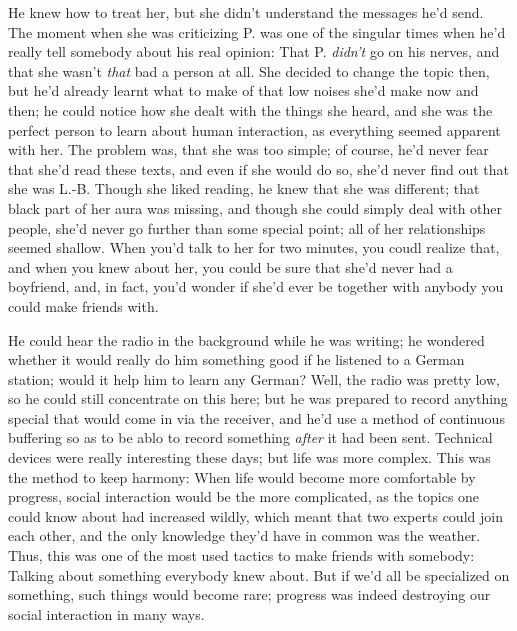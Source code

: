 He knew how to treat her, but she didn't understand the messages he'd send. The moment when she was criticizing P. was one of the singular times when he'd really tell somebody about his real opinion: That P. \emph{didn't} go on his nerves, and that she wasn't \emph{that} bad a person at all. She decided to change the topic then, but he'd already learnt what to make of that low noises she'd make now and then; he could notice how she dealt with the things she heard, and she was the perfect person to learn about human interaction, as everything seemed apparent with her. The problem was, that she was too simple; of course, he'd never fear that she'd read these texts, and even if she would do so, she'd never find out that she was L.-B. Though she liked reading, he knew that she was different; that black part of her aura was missing, and though she could simply deal with other people, she'd never go further than some special point; all of her relationships seemed shallow. When you'd talk to her for two minutes, you coudl realize that, and when you knew about her, you could be sure that she'd never had a boyfriend, and, in fact, you'd wonder if she'd ever be together with anybody you could make friends with.

He could hear the radio in the background while he was writing; he wondered whether it would really do him something good if he listened to a German station; would it help him to learn any German? Well, the radio was pretty low, so he could still concentrate on this here; but he was prepared to record anything special that would come in via the receiver, and he'd use a method of continuous buffering so as to be ablo to record something \emph{after} it had been sent. Technical devices were really interesting these days; but life was more complex. This was the method to keep harmony: When life would become more comfortable by progress, social interaction would be the more complicated, as the topics one could know about had increased wildly, which meant that two experts could join each other, and the only knowledge they'd have in common was the weather. Thus, this was one of the most used tactics to make friends with somebody: Talking about something everybody knew about. But if we'd all be specialized on something, such things would become rare; progress was indeed destroying our social interaction in many ways.

